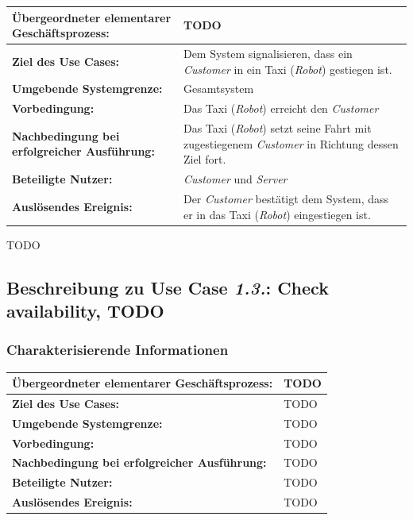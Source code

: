 				\begin{table}[H]
					\centering
					\begin{tabularx}{\textwidth}{|p{5cm}|X|}
						\hline
						\textbf{Übergeordneter elementarer Geschäftsprozess:} & TODO  \\ \hline
						\textbf{Ziel des Use Cases:} & Dem System signalisieren, dass ein \emph{Customer} in ein Taxi (\emph{Robot}) gestiegen ist. \\ \hline
						\textbf{Umgebende Systemgrenze:} & Gesamtsystem \\ \hline
						\textbf{Vorbedingung:} & Das Taxi (\emph{Robot}) erreicht den \emph {Customer} \\ \hline
						\textbf{Nachbedingung bei erfolgreicher Ausführung:} & Das Taxi (\emph{Robot}) setzt seine Fahrt mit zugestiegenem \emph{Customer} in Richtung dessen Ziel fort. \\ \hline
						\textbf{Beteiligte Nutzer:} & \emph{Customer} und \emph{Server} \\ \hline
						\textbf{Auslösendes Ereignis:} & Der \emph{Customer} bestätigt dem System, dass er in das Taxi (\emph{Robot}) eingestiegen ist. \\
						\hline
					\end{tabularx}
				\end{table}
				
				TODO
		
			\subsection*{Beschreibung zu Use Case \emph{1.3.}: Check availability, TODO}
				\subsubsection*{Charakterisierende Informationen}
				
				\begin{table}[H]
					\centering
					\begin{tabularx}{\textwidth}{|p{5cm}|X|}
						\hline
						\textbf{Übergeordneter elementarer Geschäftsprozess:} & TODO  \\ \hline
						\textbf{Ziel des Use Cases:} & TODO \\ \hline
						\textbf{Umgebende Systemgrenze:} & TODO \\ \hline
						\textbf{Vorbedingung:} & TODO \\ \hline
						\textbf{Nachbedingung bei erfolgreicher Ausführung:} & TODO \\ \hline
						\textbf{Beteiligte Nutzer:} & TODO \\ \hline
						\textbf{Auslösendes Ereignis:} & TODO \\
						\hline
					\end{tabularx}
				\end{table}
				
